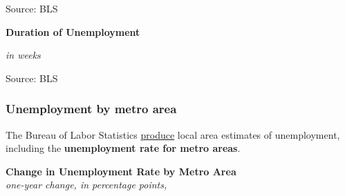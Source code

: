 \documentclass{report}
\makeatletter
\newcommand{\tbllink}[1]{\href{https://raw.githubusercontent.com/bdecon/US-chartbook/master/chartbook/data/#1}{\faTable}}
\newcommand*\short[1]{\expandafter\@gobbletwo\number\numexpr#1\relax}
\newcommand{\stdnode}[3]{\node[below, align=left, shift=({#1,#2})]{#3};}
\newcommand{\dateaxisticks}{
		date coordinates in=x, axis line style={draw=none},
		xmax={2020-08-10},
		max space between ticks=40,	    
		xtick={{1990-01-01}, {1992-01-01}, {1994-01-01}, 
			{1996-01-01}, {1998-01-01}, {2000-01-01}, 
			{2002-01-01}, {2004-01-01}, {2006-01-01},
			{2008-01-01}, {2010-01-01}, {2012-01-01}, {2014-01-01},
		    {2016-01-01}, {2018-01-01}, {2020-01-01}},
		minor xtick={{1989-01-01}, {1991-01-01}, {1993-01-01},
			{1995-01-01}, {1997-01-01}, {1999-01-01}, 
			{2001-01-01}, {2003-01-01}, {2005-01-01}, {2007-01-01},
		    {2009-01-01}, {2011-01-01}, {2013-01-01}, {2015-01-01},
		    {2017-01-01}, {2019-01-01}},
		enlarge y limits={0.06}, enlarge x limits={0.01},
		}
\newcommand{\bbar}[2]{extra #1 ticks = {{#2}}, extra #1 tick labels = ,
		extra #1 tick style = {grid=major, grid style={thick, black!25}},}
\newcommand{\stdline}[4]{\addplot[very thick, no markers, color=#1] 
		table [x=#2, y=#3, col sep=comma] {#4};	}
\newcommand{\rbars}{
		\fill[color=black!10] (axis cs:{1990-07-01},\pgfkeysvalueof{/pgfplots/ymin}) rectangle 
			(axis cs:{1991-03-01}, \pgfkeysvalueof{/pgfplots/ymax});
		\fill[color=black!10] (axis cs:{2007-12-01},\pgfkeysvalueof{/pgfplots/ymin}) rectangle 
			(axis cs:{2009-07-01}, \pgfkeysvalueof{/pgfplots/ymax});
		\fill[color=black!10] (axis cs:{2001-03-01},\pgfkeysvalueof{/pgfplots/ymin}) rectangle 
			(axis cs:{2001-11-01}, \pgfkeysvalueof{/pgfplots/ymax});
		\fill[color=black!10] (axis cs:{2020-02-01},\pgfkeysvalueof{/pgfplots/ymin}) rectangle 
			(axis cs:{2020-09-01}, \pgfkeysvalueof{/pgfplots/ymax});}
\makeatother
\begin{document}
{{{{{{{{{\begin{minipage}{0.37\textwidth}
\footnotesize{Source: BLS} \hfill \tbllink{ltu.csv}
\end{minipage}

\vspace{3mm}

\begin{minipage}{0.76\textwidth} 
\small 

\vspace{3mm}

\normalsize \textbf{Duration of Unemployment}

\footnotesize{\textit{in weeks}}

\hspace*{-2mm} 

\footnotesize{Source: BLS} \hfill \tbllink{unempdur.csv}
\end{minipage}
\newpage

\subsubsection*{\color{black!70} \seriffont Unemployment by metro area}

\begin{minipage}{0.76\textwidth}


\small The Bureau of Labor Statistics \href{https://www.bls.gov/lau/}{produce} local area estimates of unemployment, including the \textbf{unemployment rate for metro areas}. \\

\vspace{2mm}

\noindent \normalsize \textbf{Change in Unemployment Rate by Metro Area}\\
\footnotesize{\textit{one-year change, in percentage points, }}\\

\vspace{-2mm}


\end{minipage}}}}}}}}}}
\end{document}
